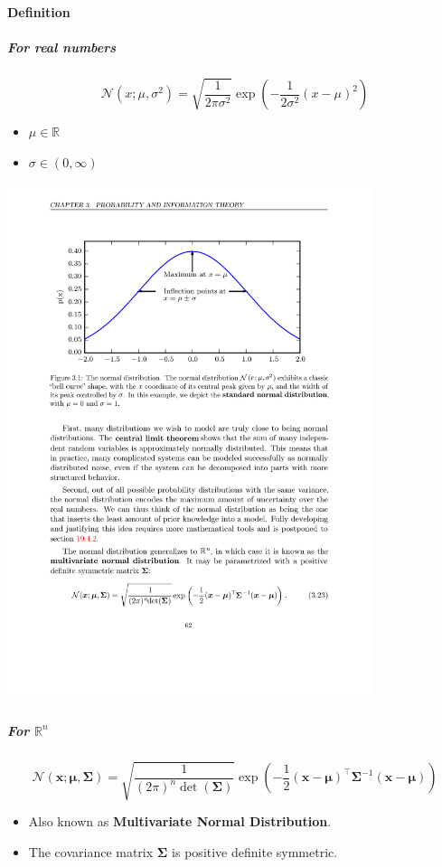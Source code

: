 \documentclass[12pt, a4paper]{article}
\def\vx{\boldsymbol{x}}
\def\vmu{\boldsymbol{\mu}}
\def\vSigma{\boldsymbol{\Sigma}}
\newcommand{\ND}[3]{\mathcal{N}(#1;#2,#3)}
\begin{document}
\paragraph{Definition}
\subparagraph{For real numbers}
\[
    \ND{x}{\mu}{\sigma^2} = \sqrt{\frac{1}{2\pi\sigma^2}} \exp \left( -\frac{1}{2\sigma^2}(x-\mu)^2 \right)
\]
\begin{itemize}
    \item $\mu \in \mathbb{R}$
    \item $\sigma \in (0, \infty)$
\end{itemize}
\begin{center}
    \includegraphics[width=0.8\textwidth]{../imgs/Gaussian_Distribution.pdf}    
\end{center}
\subparagraph{For $\mathbb{R}^n$}
\[
    \ND{\vx}{\vmu}{\vSigma} = \sqrt{\frac{1}{(2\pi)^n \det(\vSigma)}} \exp \left( -\frac{1}{2}(\vx-\vmu)^\top \vSigma^{-1} (\vx-\vmu) \right)
\]
\begin{itemize}
    \item Also known as \textbf{Multivariate Normal Distribution}.
    \item The covariance matrix $\vSigma$ is positive definite symmetric.
\end{itemize}
\end{document}
